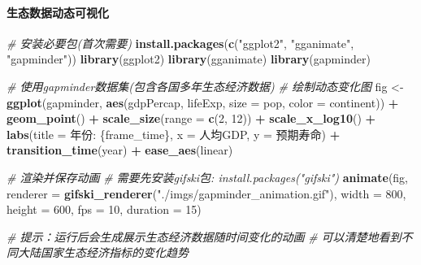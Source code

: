 \documentclass[
  twoside]{book}
\newenvironment{Shaded}{\begin{snugshade}}{\end{snugshade}}
\newcommand{\AttributeTok}[1]{\textcolor[rgb]{0.13,0.29,0.53}{#1}}
\newcommand{\CommentTok}[1]{\textcolor[rgb]{0.56,0.35,0.01}{\textit{#1}}}
\newcommand{\DecValTok}[1]{\textcolor[rgb]{0.00,0.00,0.81}{#1}}
\newcommand{\FunctionTok}[1]{\textcolor[rgb]{0.13,0.29,0.53}{\textbf{#1}}}
\newcommand{\NormalTok}[1]{#1}
\newcommand{\OtherTok}[1]{\textcolor[rgb]{0.56,0.35,0.01}{#1}}
\newcommand{\SpecialCharTok}[1]{\textcolor[rgb]{0.81,0.36,0.00}{\textbf{#1}}}
\newcommand{\StringTok}[1]{\textcolor[rgb]{0.31,0.60,0.02}{#1}}
\begin{document}
\hypertarget{ux751fux6001ux6570ux636eux52a8ux6001ux53efux89c6ux5316}{%
\paragraph{生态数据动态可视化}\label{ux751fux6001ux6570ux636eux52a8ux6001ux53efux89c6ux5316}}

\begin{Shaded}
\begin{Highlighting}[]
\CommentTok{\# 安装必要包(首次需要)}
\FunctionTok{install.packages}\NormalTok{(}\FunctionTok{c}\NormalTok{(}\StringTok{"ggplot2"}\NormalTok{, }\StringTok{"gganimate"}\NormalTok{, }\StringTok{"gapminder"}\NormalTok{))}
\FunctionTok{library}\NormalTok{(ggplot2)}
\FunctionTok{library}\NormalTok{(gganimate)}
\FunctionTok{library}\NormalTok{(gapminder)}

\CommentTok{\# 使用gapminder数据集(包含各国多年生态经济数据)}
\CommentTok{\# 绘制动态变化图}
\NormalTok{fig }\OtherTok{\textless{}{-}} \FunctionTok{ggplot}\NormalTok{(gapminder, }\FunctionTok{aes}\NormalTok{(gdpPercap, lifeExp, }\AttributeTok{size =}\NormalTok{ pop, }\AttributeTok{color =}\NormalTok{ continent)) }\SpecialCharTok{+}
  \FunctionTok{geom\_point}\NormalTok{() }\SpecialCharTok{+}
  \FunctionTok{scale\_size}\NormalTok{(}\AttributeTok{range =} \FunctionTok{c}\NormalTok{(}\DecValTok{2}\NormalTok{, }\DecValTok{12}\NormalTok{)) }\SpecialCharTok{+}
  \FunctionTok{scale\_x\_log10}\NormalTok{() }\SpecialCharTok{+}
  \FunctionTok{labs}\NormalTok{(}\AttributeTok{title =} \StringTok{\textquotesingle{}年份: \{frame\_time\}\textquotesingle{}}\NormalTok{, }\AttributeTok{x =} \StringTok{\textquotesingle{}人均GDP\textquotesingle{}}\NormalTok{, }\AttributeTok{y =} \StringTok{\textquotesingle{}预期寿命\textquotesingle{}}\NormalTok{) }\SpecialCharTok{+}
  \FunctionTok{transition\_time}\NormalTok{(year) }\SpecialCharTok{+}
  \FunctionTok{ease\_aes}\NormalTok{(}\StringTok{\textquotesingle{}linear\textquotesingle{}}\NormalTok{)}

\CommentTok{\# 渲染并保存动画}
\CommentTok{\# 需要先安装gifski包: install.packages("gifski")}
\FunctionTok{animate}\NormalTok{(fig, }\AttributeTok{renderer =} \FunctionTok{gifski\_renderer}\NormalTok{(}\StringTok{"./imgs/gapminder\_animation.gif"}\NormalTok{), }
        \AttributeTok{width =} \DecValTok{800}\NormalTok{, }\AttributeTok{height =} \DecValTok{600}\NormalTok{, }\AttributeTok{fps =} \DecValTok{10}\NormalTok{, }\AttributeTok{duration =} \DecValTok{15}\NormalTok{)}

\CommentTok{\# 提示：运行后会生成展示生态经济数据随时间变化的动画}
\CommentTok{\# 可以清楚地看到不同大陆国家生态经济指标的变化趋势}
\end{Highlighting}
\end{Shaded}
\end{document}
